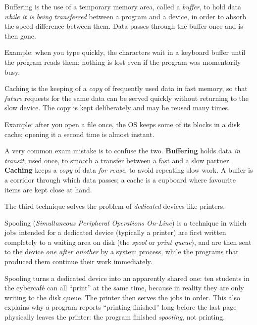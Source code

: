 \documentclass[11pt]{article}
\newcommand{\cle}[1]{{\popxbold\color{popdark}#1}}
\begin{document}
\begin{definition}[Buffering]
\cle{Buffering} is the use of a temporary memory area, called a \emph{buffer}, to hold data \emph{while it is being transferred} between a program and a device, in order to absorb the speed difference between them. Data passes through the buffer once and is then gone.
\end{definition}

Example: when you type quickly, the characters wait in a keyboard buffer until the program reads them; nothing is lost even if the program was momentarily busy.

\begin{definition}[Caching]
\cle{Caching} is the keeping of a \emph{copy} of frequently used data in fast memory, so that \emph{future} requests for the same data can be served quickly without returning to the slow device. The copy is kept deliberately and may be reused many times.
\end{definition}

Example: after you open a file once, the OS keeps some of its blocks in a disk cache; opening it a second time is almost instant.

\begin{attention}
A very common exam mistake is to confuse the two. \textbf{Buffering} holds data \emph{in transit}, used once, to smooth a transfer between a fast and a slow partner. \textbf{Caching} keeps a \emph{copy} of data \emph{for reuse}, to avoid repeating slow work. A buffer is a corridor through which data passes; a cache is a cupboard where favourite items are kept close at hand.
\end{attention}

The third technique solves the problem of \emph{dedicated} devices like printers.

\begin{definition}[Spooling]
\cle{Spooling} (\emph{Simultaneous Peripheral Operations On-Line}) is a technique in which jobs intended for a dedicated device (typically a printer) are first written completely to a waiting area on disk (the \emph{spool} or \emph{print queue}), and are then sent to the device \emph{one after another} by a system process, while the programs that produced them continue their work immediately.
\end{definition}

Spooling turns a dedicated device into an apparently shared one: ten students in the cybercafé can all ``print'' at the same time, because in reality they are only writing to the disk queue. The printer then serves the jobs in order. This also explains why a program reports ``printing finished'' long before the last page physically leaves the printer: the program finished \emph{spooling}, not printing.
\end{document}
